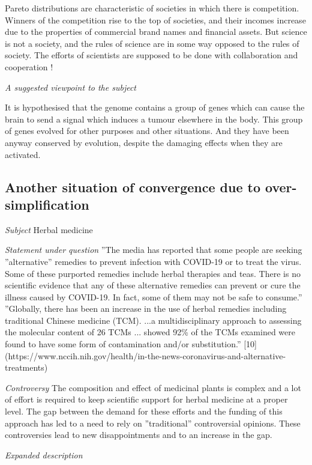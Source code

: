 \documentclass[12pt,aps]{revtex4}
\begin{document}
Pareto distributions are characteristic of societies in which there is competition. Winners of the competition rise to the top of societies, and their incomes increase due to the properties of commercial brand names and financial assets.
But science is not a society, and the rules of science are in some way opposed to the rules of society. The efforts of scientists are supposed to be done with collaboration and cooperation !

\emph{A suggested viewpoint to the subject}

It is hypothesised that the genome contains a group of genes which can cause the brain to send a signal which induces a tumour elsewhere in the body. This group of genes evolved for other purposes and other situations. And they have been anyway conserved by evolution, despite the damaging effects when they are activated.

\subsection{Another situation of convergence due to over-simplification}

\emph{Subject} Herbal medicine

\emph{Statement under question} ''The media has reported that some people are seeking ''alternative'' remedies to prevent infection with COVID-19 or to treat the virus. Some of these purported remedies include herbal therapies and teas. There is no scientific evidence that any of these alternative remedies can prevent or cure the illness caused by COVID-19. In fact, some of them may not be safe to consume.'' ''Globally, there has
been an increase in the use of herbal remedies including traditional
Chinese medicine (TCM). ...a multidisciplinary approach to assessing
the molecular content of 26 TCMs ... showed 92\% of the TCMs examined
were found to have some form of contamination and/or substitution.''
[10] (https://www.nccih.nih.gov/health/in-the-news-coronavirus-and-alternative-treatments)

\emph{Controversy} The composition and effect of medicinal plants is complex
and a lot of effort is required to keep scientific support for herbal
medicine at a proper level. The gap between the demand for these
efforts and the funding of this approach has led to a need to rely on
''traditional'' controversial opinions. These controversies lead to new
disappointments and to an increase in the gap.
 
\emph{Expanded description}
\end{document}
